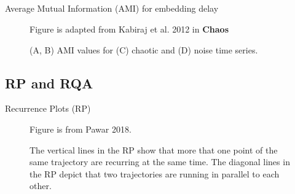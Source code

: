 \subsection{}
{

\begin{frame}{Average Mutual Information (AMI) for embedding delay}
    \begin{figure}
        \centering
	{Figure is adapted from Kabiraj et al. 2012 in {\bf Chaos}}
	\caption{(A, B) AMI values for (C) chaotic and (D) noise time series.} 
   \end{figure}
	
\end{frame}
}








\subsection{RP and RQA}
{

\begin{frame}{Recurrence Plots (RP)}

    \begin{figure}
	{Figure is from Pawar 2018.} 
	\caption{
	The vertical lines in the RP show that more that one point of 
	the same trajectory are recurring at the same time.
	The diagonal lines in the RP depict that two trajectories are running in parallel
	to each other.
}
   
\end{figure}
	


%


\end{frame}
}



